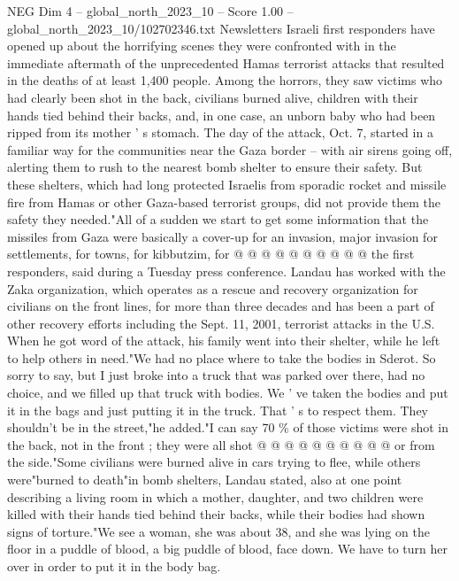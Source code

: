 \begin{textsample}{NEG Dim 4 – global\_north\_2023\_10 – Score 1.00 – global\_north\_2023\_10/102702346.txt}  \label{ex:f4_neg_020}
Newsletters Israeli first responders have opened up about the horrifying scenes they were confronted with in the immediate aftermath of the unprecedented Hamas terrorist attacks that resulted in the deaths of at least 1,400 people.
Among the horrors, they saw victims who had clearly been shot in the back, civilians burned alive, children with their hands tied behind their backs, and, in one case, an unborn baby who had been ripped from its mother ' s stomach.
The day of the attack, Oct. 7, started in a familiar way for the communities near the Gaza border -- with air sirens going off, alerting them to rush to the nearest bomb shelter to ensure their safety.
But these shelters, which had long protected Israelis from sporadic rocket and missile fire from Hamas or other Gaza-based terrorist groups, did not provide them the safety they needed."All of a sudden we start to get some information that the missiles from Gaza were basically a cover-up for an invasion, major invasion for settlements, for towns, for kibbutzim, for @ @ @ @ @ @ @ @ @ @ the first responders, said during a Tuesday press conference.
Landau has worked with the Zaka organization, which operates as a rescue and recovery organization for civilians on the front lines, for more than three decades and has been a part of other recovery efforts including the Sept. 11, 2001, terrorist attacks in the U.S.
When he got word of the attack, his family went into their shelter, while he left to help others in need."We had no place where to take the bodies in Sderot.
So sorry to say, but I just broke into a truck that was parked over there, had no choice, and we filled up that truck with bodies.
We ' ve taken the bodies and put it in the bags and just putting it in the truck.
That ' s to respect them.
They shouldn't be in the street,"he added."I can say 70 \% of those victims were shot in the back, not in the front ; they were all shot @ @ @ @ @ @ @ @ @ @ or from the side."Some civilians were burned alive in cars trying to flee, while others were"burned to death"in bomb shelters, Landau stated, also at one point describing a living room in which a mother, daughter, and two children were killed with their hands tied behind their backs, while their bodies had shown signs of torture."We see a woman, she was about 38, and she was lying on the floor in a puddle of blood, a big puddle of blood, face down.
We have to turn her over in order to put it in the body bag.

\end{textsample}
